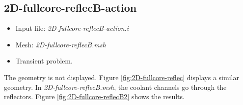 \documentclass[11pt,letterpaper]{article}
\begin{document}
\subsection{2D-fullcore-reflecB-action}

	\begin{itemize}
		\item Input file: \textit{2D-fullcore-reflecB-action.i}
		\item Mesh: \textit{2D-fullcore-reflecB.msh}
		\item Transient problem.
	\end{itemize}

The geometry is not displayed.
Figure \ref{fig:2D-fullcore-reflec} displays a similar geometry.
In \textit{2D-fullcore-reflecB.msh}, the coolant channels go through the reflectors.
Figure \ref{fig:2D-fullcore-reflecB2} shows the results.
\end{document}
